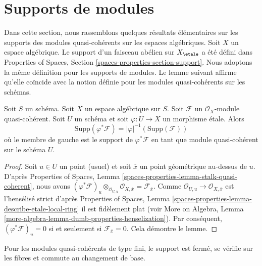 \section{Supports de modules}
\label{section-support}

\noindent
Dans cette section, nous rassemblons quelques résultats élémentaires sur les
supports des modules quasi-cohérents sur les espaces algébriques. Soit $X$ un
espace algébrique. Le support d'un faisceau abélien sur $X_\etale$
a été défini dans Properties of Spaces, Section
\ref{spaces-properties-section-support}.
Nous adoptons la même définition pour les supports de modules.
Le lemme suivant affirme qu'elle coïncide avec la notion
définie pour les modules quasi-cohérents sur les schémas.

\begin{lemma}
\label{lemma-support-covering}
Soit $S$ un schéma. Soit $X$ un espace algébrique sur $S$.
Soit $\mathcal{F}$ un $\mathcal{O}_X$-module quasi-cohérent.
Soit $U$ un schéma et soit $\varphi : U \to X$ un morphisme étale.
Alors
$$
\text{Supp}(\varphi^*\mathcal{F}) = |\varphi|^{-1}(\text{Supp}(\mathcal{F}))
$$
où le membre de gauche est le support de $\varphi^*\mathcal{F}$ en tant que
module quasi-cohérent sur le schéma $U$.
\end{lemma}

\begin{proof}
Soit $u\in U$ un point (usuel) et soit $\overline{x}$ un
point géométrique au-dessus de $u$. D'après
Properties of Spaces, Lemma \ref{spaces-properties-lemma-stalk-quasi-coherent},
nous avons
$(\varphi^*\mathcal{F})_u \otimes_{\mathcal{O}_{U, u}}
\mathcal{O}_{X, \overline{x}} = \mathcal{F}_{\overline{x}}$.
Comme $\mathcal{O}_{U, u} \to \mathcal{O}_{X, \overline{x}}$
est l'hensélisé strict d'après
Properties of Spaces, Lemma
\ref{spaces-properties-lemma-describe-etale-local-ring}
il est fidèlement plat (voir
More on Algebra, Lemma
\ref{more-algebra-lemma-dumb-properties-henselization}).
Par conséquent, $(\varphi^*\mathcal{F})_u = 0$ si et seulement si
$\mathcal{F}_{\overline{x}} = 0$. Cela démontre le lemme.
\end{proof}

\noindent
Pour les modules quasi-cohérents de type fini, le support est fermé,
se vérifie sur les fibres et commute au changement de base.

